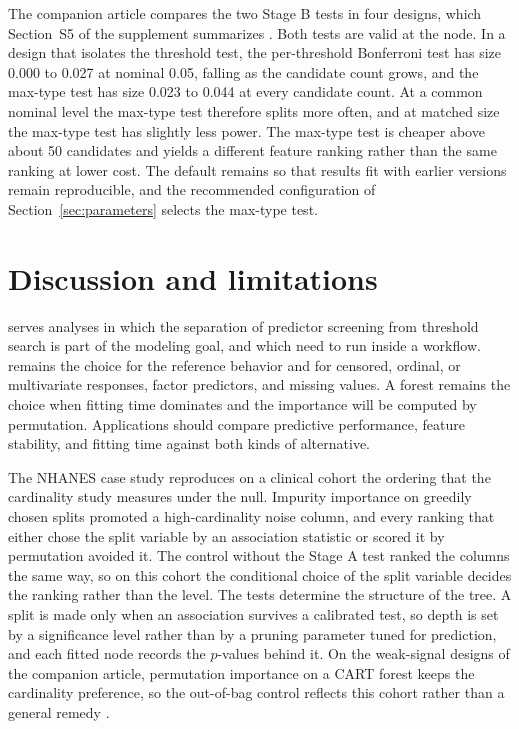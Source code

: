 \documentclass[article]{jss}
\newcommand{\citrees}{\pkg{citrees}\xspace}
\newcommand{\sklearn}{\pkg{scikit-learn}\xspace}
\begin{document}
The companion article compares the two Stage B tests in four designs, which
Section~S5 of the supplement summarizes \citep{Milletich+Downes+Goley+Hirst:2026}.
Both tests are valid at the node. In a design that isolates the threshold
test, the per-threshold Bonferroni test has size 0.000 to 0.027 at nominal
0.05, falling as the candidate count grows, and the max-type test has size
0.023 to 0.044 at every candidate count. At a common nominal level the
max-type test therefore splits more often, and at matched size the max-type
test has slightly less power. The max-type test is cheaper above about 50
candidates and yields a different feature ranking rather than the same
ranking at lower cost. The default remains  so that
results fit with earlier versions remain reproducible, and the recommended
configuration of Section~\ref{sec:parameters} selects the max-type test.

\section{Discussion and limitations} \label{sec:discussion}

\citrees serves analyses in which the separation of predictor screening from
threshold search is part of the modeling goal, and which need to run inside a
 workflow.  remains the choice for the
reference  behavior and for censored, ordinal, or multivariate
responses, factor predictors, and missing values. A \sklearn forest remains
the choice when fitting time dominates and the importance will be computed by
permutation. Applications should compare predictive performance, feature
stability, and fitting time against both kinds of alternative.

The NHANES case study reproduces on a clinical cohort the ordering that the
cardinality study measures under the null. Impurity importance on greedily
chosen splits promoted a high-cardinality noise column, and every ranking that
either chose the split variable by an association statistic or scored it by
permutation avoided it. The control without the Stage A test ranked the
columns the same way, so on this cohort the conditional choice of the split
variable decides the ranking rather than the level. The tests determine the
structure of the tree. A split is made only when an association survives a calibrated test,
so depth is set by a significance level rather than by a pruning parameter
tuned for prediction, and each fitted node records the $p$-values behind it.
On the weak-signal designs of the companion article, permutation importance
on a CART forest keeps the cardinality preference, so the out-of-bag control
reflects this cohort rather than a general remedy
\citep{Milletich+Downes+Goley+Hirst:2026}.
\end{document}
